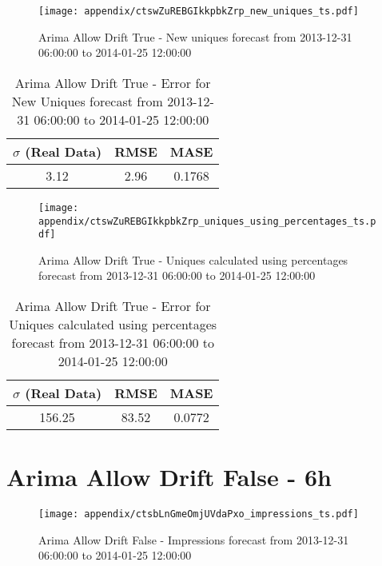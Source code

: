 \begin{figure}[H] \begin{center} \leavevmode
\texttt{[image: appendix/ctswZuREBGIkkpbkZrp\_new\_uniques\_ts.pdf]} \caption{
Arima Allow Drift True - New uniques forecast from 2013-12-31 06:00:00 to 2014-01-25 12:00:00} \label{fig:appendix/ctswZuREBGIkkpbkZrp_new_uniques_ts.pdf} \end{center}
\end{figure}

\begin{table}[H]
\centering
\footnotesize
\begin{tabular}{ccc}
$\sigma$ (Real Data) & RMSE & MASE   \\ \hline
3.12 & 2.96 & 0.1768 \\
\end{tabular}

\vspace{0.5cm}

\caption{
Arima Allow Drift True - Error for New Uniques forecast from 2013-12-31 06:00:00 to 2014-01-25 12:00:00}
\end{table}

\begin{figure}[H] \begin{center} \leavevmode
\texttt{[image: appendix/ctswZuREBGIkkpbkZrp\_uniques\_using\_percentages\_ts.pdf]} \caption{
Arima Allow Drift True - Uniques calculated using percentages forecast from 2013-12-31 06:00:00 to 2014-01-25 12:00:00} \label{fig:appendix/ctswZuREBGIkkpbkZrp_uniques_using_percentages_ts.pdf} \end{center}
\end{figure}

\begin{table}[H]
\centering
\footnotesize
\begin{tabular}{ccc}
$\sigma$ (Real Data) & RMSE & MASE   \\ \hline
156.25 & 83.52 & 0.0772 \\
\end{tabular}

\vspace{0.5cm}

\caption{
Arima Allow Drift True - Error for Uniques calculated using percentages forecast from 2013-12-31 06:00:00 to 2014-01-25 12:00:00}
\end{table}

\section{Arima Allow Drift False - 6h}
\begin{figure}[H] \begin{center} \leavevmode
\texttt{[image: appendix/ctsbLnGmeOmjUVdaPxo\_impressions\_ts.pdf]} \caption{
Arima Allow Drift False - Impressions forecast from 2013-12-31 06:00:00 to 2014-01-25 12:00:00} \label{fig:appendix/ctsbLnGmeOmjUVdaPxo_impressions_ts.pdf} \end{center}
\end{figure}


